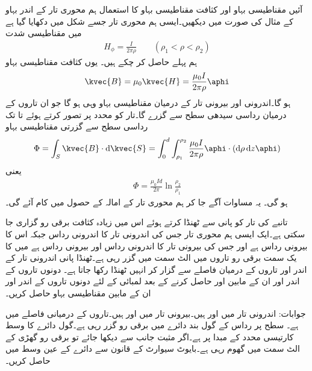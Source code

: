 آئیں مقناطیسی بہاو اور کثافت مقناطیسی بہاو کا استعمال ہم محوری تار کے اندر بہاو کے مثال کی صورت میں دیکھیں۔ایسی ہم محوری تار جسے شکل  میں دکھایا گیا ہے میں مقناطیسی شدت
\begin{align*}
H_{\phi}=\frac{I}{2\pi \rho} \quad \quad (\rho_1 < \rho < \rho_2)
\end{align*}
ہم پہلے حاصل کر چکے ہیں۔ یوں کثافت مقناطیسی بہاو
\begin{align*}
\kvec{B}=\mu_0 \kvec{H}=\frac{\mu_0 I}{2\pi \rho} \aphi
\end{align*}
ہو گا۔اندرونی اور بیرونی تار کے درمیان مقناطیسی بہاو وہی ہو گا جو ان تاروں کے درمیان رداسی سیدھی سطح سے گزرے گا۔تار کو  محدد پر تصور کرتے ہوئے  تا  تک رداسی سطح سے گزرتی مقناطیسی بہاو
\begin{align*}
\Phi=\int_S \kvec{B} \cdot \dif \kvec{S}=\int_{0}^{d} \int_{\rho_1}^{\rho_2} \frac{\mu_0 I}{2\pi \rho} \aphi \cdot (\dif \rho \dif z \aphi)
\end{align*}
یعنی
\begin{align}
\Phi=\frac{\mu_0 I d}{2\pi} \ln \frac{\rho_2}{\rho_1}
\end{align}
ہو گی۔ یہ مساوات آگے جا کر ہم محوری تار کے امالہ کے حصول میں کام آئے گی۔

تانبے کی تار کو پانی سے ٹھنڈا کرتے ہوئے اس میں زیادہ کثافت برقی رو گزاری جا سکتی ہے۔ایک ایسی ہم محوری تار جس کی اندرونی تار کا اندرونی رداس  جبکہ اس کا بیرونی رداس  ہے اور جس کی بیرونی تار کا اندرونی رداس  اور بیرونی رداس  ہے میں  کا یک سمت برقی رو تاروں میں الٹ سمت میں گزر رہی ہے۔ٹھنڈا پانی اندرونی تار کے اندر اور تاروں کے درمیان فاصلے سے گزار کر انہیں ٹھنڈا رکھا جاتا ہے۔ دونوں تاروں کے اندر اور ان کے مابین  اور  حاصل کرنے کے بعد   لمبائی کے  لئے  دونوں تاروں کے اندر اور ان کے مابین  مقناطیسی بہاو حاصل کریں۔

جوابات: اندرونی تار میں  اور  ہیں۔بیرونی تار میں  اور  ہیں۔تاروں کے درمیانی فاصلے میں  ہے۔
 سطح پر  رداس کے گول بند دائرے میں  برقی رو گزر رہی ہے۔گول دائرے کا وسط کارتیسی محدد کے مبدا  پر ہے۔اگر مثبت  جانب  سے دیکھا جائے تو برقی رو گھڑی کے الٹ سمت میں گھوم رہی ہے۔بایوٹ سیوارٹ کے قانون سے دائرے کے عین وسط میں  حاصل کریں۔

